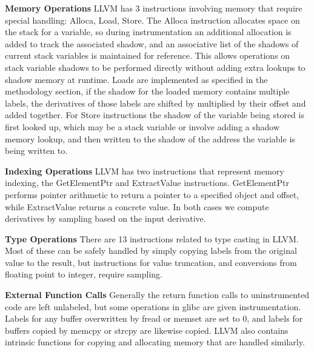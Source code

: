 \noindent \textbf{Memory Operations} LLVM has 3 instructions involving memory that require special handling: Alloca, Load, Store. The Alloca instruction allocates space on the stack for a variable, so during instrumentation an additional allocation is added to track the associated shadow, and an associative list of the shadows of current stack variables is maintained for reference. This allows operations on stack variable shadows to be performed directly without adding extra lookups to shadow memory at runtime. Loads are implemented as specified in the methodology section, if the shadow for the loaded memory contains multiple labels, the derivatives of those labels are shifted by multiplied by their offset and added together. For Store instructions the shadow of the variable being stored is first looked up, which may be a stack variable or involve adding a shadow memory lookup, and then written to the shadow of the address the variable is being written to.

\noindent \textbf{Indexing Operations} LLVM has two instructions that represent memory indexing, the GetElementPtr and ExtractValue instructions. GetElementPtr performs pointer arithmetic to return a pointer to a specified object and offset, while ExtractValue returns a concrete value. In both cases we compute derivatives by sampling based on the input derivative. 

\noindent \textbf{Type Operations} There are 13 instructions related to type casting in LLVM. Most of these can be safely handled by simply copying labels from the original value to the result, but instructions for value truncation, and conversions from floating point to integer, require sampling. 

\noindent \textbf{External Function Calls} Generally the return function calls to uninstrumented code are left unlabeled, but some operations in glibc are given instrumentation. Labels for any buffer overwritten by fread or memset are set to 0, and labels for buffers copied by memcpy or strcpy are likewise copied. LLVM also contains intrinsic functions for copying and allocating memory that are handled similarly. 


